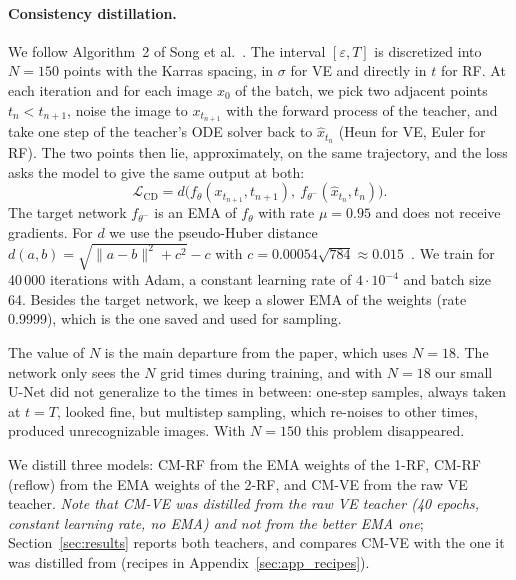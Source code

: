 \documentclass{article}
\begin{document}
\paragraph{Consistency distillation.} We follow Algorithm~2 of Song et
al.~\cite{song2023consistency}. The interval $[\varepsilon, T]$ is
discretized into $N = 150$ points with the Karras spacing, in $\sigma$ for VE
and directly in $t$ for RF. At each iteration and for each image $x_0$ of the
batch, we pick two adjacent points $t_n < t_{n+1}$, noise the image to
$x_{t_{n+1}}$ with the forward process of the teacher, and take one step of
the teacher's ODE solver back to $\hat{x}_{t_n}$ (Heun for VE, Euler for RF).
The two points then lie, approximately, on the same trajectory, and the loss
asks the model to give the same output at both:
\begin{equation}
  \mathcal{L}_\text{CD} = d\big(f_\theta(x_{t_{n+1}}, t_{n+1}),\ f_{\theta^-}(\hat{x}_{t_n}, t_n)\big).
\end{equation}
The target network $f_{\theta^-}$ is an EMA of $f_\theta$ with rate
$\mu = 0.95$ and does not receive gradients. For $d$ we use the pseudo-Huber
distance $d(a, b) = \sqrt{\|a - b\|^2 + c^2} - c$ with
$c = 0.00054\sqrt{784} \approx 0.015$~\cite{song2024improved}. We train for
40\,000 iterations with Adam, a constant learning rate of $4\cdot10^{-4}$ and
batch size 64. Besides the target network, we keep a slower EMA of the weights
(rate 0.9999), which is the one saved and used for sampling.

The value of $N$ is the main departure from the paper, which uses $N = 18$.
The network only sees the $N$ grid times during training, and with $N = 18$
our small U-Net did not generalize to the times in between: one-step samples,
always taken at $t = T$, looked fine, but multistep sampling, which re-noises
to other times, produced unrecognizable images. With $N = 150$ this problem
disappeared.

We distill three models: CM-RF from the EMA weights of the 1-RF, CM-RF
(reflow) from the EMA weights of the 2-RF, and CM-VE from the raw VE teacher.
\emph{Note that CM-VE was distilled from the raw VE teacher (40 epochs, constant
learning rate, no EMA) and not from the better EMA one}; Section~\ref{sec:results}
reports both teachers, and compares CM-VE with the one it was distilled from
(recipes in Appendix~\ref{sec:app_recipes}).
\end{document}
